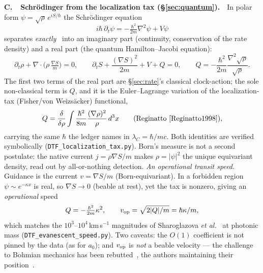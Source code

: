 \documentclass[11pt]{article}
\begin{document}
\medskip
\noindent\textbf{C.\ \ Schr\"odinger from the localization tax (\S\ref{sec:quantum}).}\ \
In polar form $\psi=\sqrt\rho\,e^{iS/\hbar}$ the Schr\"odinger equation
\[ i\hbar\,\partial_t\psi=-\tfrac{\hbar^2}{2m}\nabla^2\psi+V\psi \]
separates \emph{exactly}~\cite{Madelung1927} into an imaginary part (continuity, conservation of the rate
density) and a real part (the quantum Hamilton--Jacobi equation):
\[ \partial_t\rho+\nabla\!\cdot\!\big(\rho\,\tfrac{\nabla S}{m}\big)=0 , \qquad
   \partial_t S+\frac{(\nabla S)^2}{2m}+V+Q=0 , \qquad
   Q=-\frac{\hbar^2}{2m}\frac{\nabla^2\!\sqrt\rho}{\sqrt\rho} . \]
The first two terms of the real part are \S\ref{sec:rate}'s classical clock-action; the sole non-classical term is $Q$,
and it is the Euler--Lagrange variation of the localization-tax (Fisher/von Weizs\"acker) functional,
\[
Q=\frac{\delta}{\delta\rho}\int\frac{\hbar^2}{8m}\frac{(\nabla\rho)^2}{\rho}\,d^3x
\qquad\text{(Reginatto~\cite{Reginatto1998})},
\]
carrying the same $\hbar$ the ledger names in $\lambda_C=\hbar/mc$. Both identities are verified symbolically
(\texttt{DTF\_localization\_tax.py}). Born's measure is not a second postulate: the native current
$j=\rho\nabla S/m$ makes $\rho=|\psi|^2$ the unique equivariant density, read out by all-or-nothing detection.
\emph{An operational transit speed.} Guidance is the current $v=\nabla S/m$ (Born-equivariant). In a forbidden
region $\psi\sim e^{-\kappa x}$ is real, so $\nabla S\to0$ (beable at rest), yet the tax is nonzero, giving an
\emph{operational} speed
\[ Q=-\tfrac{\hbar^2}{2m}\kappa^2 , \qquad v_{\rm op}=\sqrt{2|Q|/m}=\hbar\kappa/m , \]
which matches the $10^3$--$10^4\,$km\,s$^{-1}$ magnitudes of Sharoglazova \emph{et al.}~\cite{Sharoglazova2025}
at photonic mass (\texttt{DTF\_evanescent\_speed.py}). Two caveats: the $O(1)$ coefficient is not pinned by the
data (as for $a_0$); and $v_{\rm op}$ is \emph{not} a beable velocity --- the challenge to Bohmian mechanics
has been rebutted~\cite{DrezetLazaroviciNabet2026,Nikolic2025}, the authors maintaining their
position~\cite{SharoglazovaReply2025}.
\end{document}
